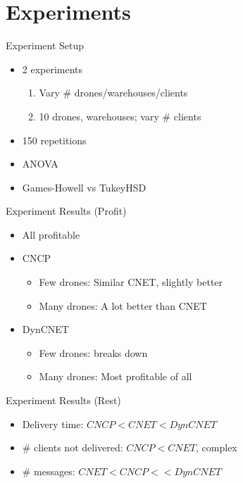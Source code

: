 \documentclass{beamer}
\begin{document}
	\section{Experiments}
	\begin{frame}{Experiment Setup}
		\begin{itemize}
			\item 2 experiments
				\begin{enumerate}
				\item Vary \# drones/warehouses/clients
				\item 10 drones, warehouses; vary \# clients
				\end{enumerate}
			\item 150 repetitions
			\item ANOVA
			\item Games-Howell vs TukeyHSD
		\end{itemize}
	\end{frame}
	\begin{frame}{Experiment Results (Profit)}
		\begin{itemize}
			\item All profitable
			\item CNCP
				\begin{itemize}
				\item Few drones: Similar CNET, slightly better
				\item Many drones: A lot better than CNET
				\end{itemize}
			\item DynCNET
			\begin{itemize}
				\item Few drones: breaks down
				\item Many drones: Most profitable of all
			\end{itemize}
		\end{itemize}
	\end{frame}
	\begin{frame}{Experiment Results (Rest)}
		\begin{itemize}
			\item Delivery time: $CNCP < CNET < DynCNET$
			\item \# clients not delivered: $CNCP < CNET$, complex
			\item \# messages: $CNET < CNCP << DynCNET$
		\end{itemize}
	\end{frame}
	
\end{document}
